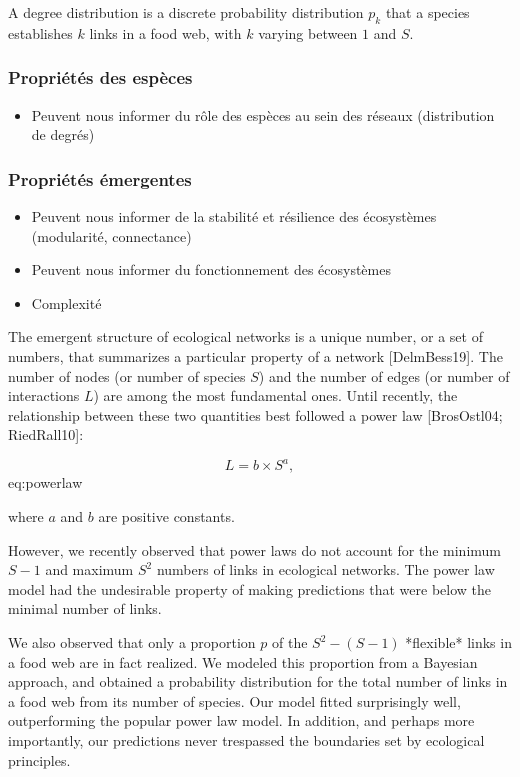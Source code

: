 A degree
distribution is a discrete probability distribution $p_k$ that a species
establishes $k$ links in a food web, with $k$ varying between $1$ and $S$.

\subsubsection{Propriétés des espèces} 

\begin{itemize}
    \item Peuvent nous informer du rôle des espèces au sein des réseaux (distribution de degrés)
\end{itemize}

\subsubsection{Propriétés émergentes} 

\begin{itemize}
    \item Peuvent nous informer de la stabilité et résilience des écosystèmes (modularité, connectance)
    \item Peuvent nous informer du fonctionnement des écosystèmes 
    \item Complexité 
\end{itemize}

The emergent structure of ecological networks is a unique number, or a set of
numbers, that summarizes a particular property of a network [DelmBess19]. The
number of nodes (or number of species $S$) and the number of edges (or number of
interactions $L$) are among the most fundamental ones. Until recently, the
relationship between these two quantities best followed a power law
[BrosOstl04; RiedRall10]:

$$ L = b \times S^a, $$ {eq:powerlaw}

where $a$ and $b$ are positive constants.

However, we recently observed that power laws do not account for the minimum
$S-1$ and maximum $S^2$ numbers of links in ecological networks. The power law model had the undesirable property of
making predictions that were below the minimal number of links.

We also observed that only a proportion $p$ of the $S^2 - (S-1)$ *flexible*
links in a food web are in fact realized. We modeled this proportion from a
Bayesian approach, and obtained a probability distribution for the total number
of links in a food web from its number of species. Our model fitted surprisingly
well, outperforming the popular power law model. In addition, and perhaps more
importantly, our predictions never trespassed the boundaries set by ecological
principles.

